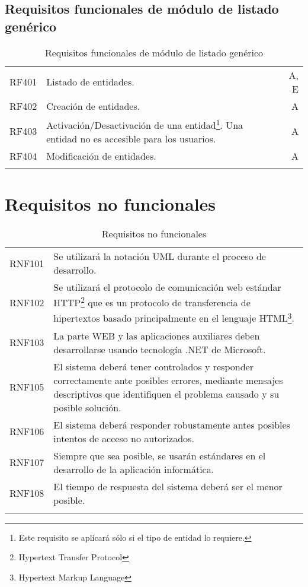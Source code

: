 \subsection{Requisitos funcionales de módulo de listado genérico}
\label{cuadro:requisitos-funcionales-de-organizaciones}
\begin{longtable}{l|p{13cm}|r}
  RF401\label{RF401} & Listado de entidades. & A, E \\
  RF402\label{RF402} & Creación de entidades. & A \\
  RF403\label{RF403} & Activación/Desactivación de una entidad\footnote{Este requisito se aplicará sólo si el tipo de entidad lo requiere.}. Una entidad no es accesible para los usuarios. & A \\
  RF404\label{RF404} & Modificación de entidades. & A \\
  \caption{Requisitos funcionales de módulo de listado genérico} \\
\end{longtable}

\section{Requisitos no funcionales}

\label{cuadro:requisitos-no-funcionales}
\begin{longtable}{l|p{13.7cm}}  
  RNF101\label{RNF101} & Se utilizará la notación UML durante el proceso de desarrollo. \\
  RNF102\label{RNF102} & Se utilizará el protocolo de comunicación web estándar HTTP\footnote{Hypertext Transfer Protocol} que es un protocolo de transferencia de hipertextos basado principalmente en el lenguaje HTML\footnote{Hypertext Markup Language }. \\
  RNF103\label{RNF103} & La parte WEB y las aplicaciones auxiliares deben desarrollarse usando tecnología .NET de Microsoft. \\
  RNF105\label{RNF104} & El sistema deberá tener controlados y responder correctamente ante posibles errores, mediante mensajes descriptivos que identifiquen el problema causado y su posible solución. \\
  RNF106\label{RNF105} & El sistema deberá responder robustamente antes posibles intentos de acceso no autorizados. \\
  RNF107\label{RNF107} & Siempre que sea posible, se usarán estándares en el desarrollo de la aplicación informática. \\
  RNF108\label{RNF108} & El tiempo de respuesta del sistema deberá ser el menor posible. \\
  \caption{Requisitos no funcionales} \\
\end{longtable}

